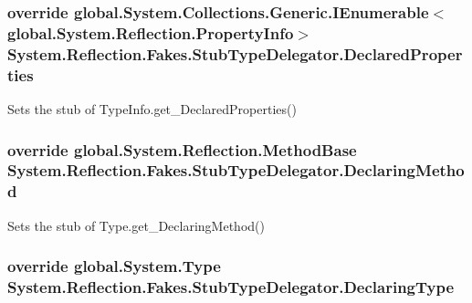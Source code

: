 \hypertarget{class_system_1_1_reflection_1_1_fakes_1_1_stub_type_delegator_ada2adf36be47da8067347cb79dc6aa72}{
\subsubsection[{Declared\-Properties}]{\setlength{\rightskip}{0pt plus 5cm}override global.\-System.\-Collections.\-Generic.\-I\-Enumerable$<$global.\-System.\-Reflection.\-Property\-Info$>$ System.\-Reflection.\-Fakes.\-Stub\-Type\-Delegator.\-Declared\-Properties\hspace{0.3cm}{\ttfamily [get]}}}\label{class_system_1_1_reflection_1_1_fakes_1_1_stub_type_delegator_ada2adf36be47da8067347cb79dc6aa72}


Sets the stub of Type\-Info.\-get\-\_\-\-Declared\-Properties()

\hypertarget{class_system_1_1_reflection_1_1_fakes_1_1_stub_type_delegator_aa2b6db107b3629df46ec058a53b98125}{
\subsubsection[{Declaring\-Method}]{\setlength{\rightskip}{0pt plus 5cm}override global.\-System.\-Reflection.\-Method\-Base System.\-Reflection.\-Fakes.\-Stub\-Type\-Delegator.\-Declaring\-Method\hspace{0.3cm}{\ttfamily [get]}}}\label{class_system_1_1_reflection_1_1_fakes_1_1_stub_type_delegator_aa2b6db107b3629df46ec058a53b98125}


Sets the stub of Type.\-get\-\_\-\-Declaring\-Method()

\hypertarget{class_system_1_1_reflection_1_1_fakes_1_1_stub_type_delegator_aecf6e7db9dc3a8d05a6120051b3c62de}{
\subsubsection[{Declaring\-Type}]{\setlength{\rightskip}{0pt plus 5cm}override global.\-System.\-Type System.\-Reflection.\-Fakes.\-Stub\-Type\-Delegator.\-Declaring\-Type\hspace{0.3cm}{\ttfamily [get]}}}\label{class_system_1_1_reflection_1_1_fakes_1_1_stub_type_delegator_aecf6e7db9dc3a8d05a6120051b3c62de}


